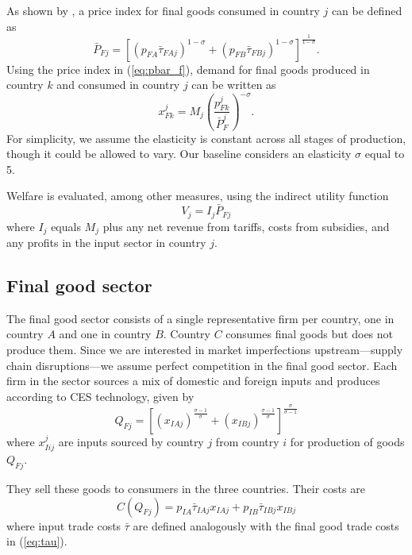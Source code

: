 \documentclass{article}
\begin{document}
As shown by \textcite{dixit_monopolistic_1977}, a price index for final goods consumed in country $j$ can be defined as
\begin{equation} \label{eq:pbar_f}
      \bar{P}_{Fj} = \left[ (p_{FA} \bar{\tau}_{FAj} )^{1-\sigma} +  (p_{FB} \bar{\tau}_{FBj})^{1-\sigma} \right]^\frac{1}{1-\sigma} .
\end{equation}
Using the price index in (\ref{eq:pbar_f}), demand for final goods produced in country $k$ and consumed in country $j$ can be written as
\begin{equation}
    x_{Fk}^{j} = M_j \left( \frac{p_{Fk}^{j}}{\bar{P}_F^{j}} \right)^{-\sigma}  .
\end{equation}
For simplicity, we assume the elasticity is constant across all stages of production, though it could be allowed to vary. Our baseline considers an elasticity $\sigma$ equal to 5.

Welfare is evaluated, among other measures, using the indirect utility function
\begin{equation} \label{eq:value}
    V_j = I_j \bar{P}_{Fj}
\end{equation}
where $I_j$ equals $M_j$ plus any net revenue from tariffs, costs from subsidies, and any profits in the input sector in country $j$.

\subsection{Final good sector}

The final good sector consists of a single representative firm per country, one in country $A$ and one in country $B$. Country $C$ consumes final goods but does not produce them. Since we are interested in market imperfections upstream---supply chain disruptions---we assume perfect competition in the final good sector. Each firm in the sector sources a mix of domestic and foreign inputs and produces according to CES technology, given by
\begin{equation}
    Q_{Fj} = \left[ \left( x_{IAj} \right)^\frac{\sigma-1}{\sigma} + \left( x_{IBj} \right)^\frac{\sigma-1}{\sigma} \right]^\frac{\sigma}{\sigma-1}
\end{equation}
where $x^j_{Iij}$ are inputs sourced by country $j$ from country $i$ for production of goods $Q_{Fj}$. 

They sell these goods to consumers in the three countries. Their costs are
\begin{equation}
    C(Q_{Fj}) = p_{IA} \bar{\tau}_{IAj} x_{IAj} + p_{IB} \bar{\tau}_{IBj} x_{IBj}
\end{equation}
where input trade costs $\bar{\tau}$ are defined analogously with the final good trade costs in (\ref{eq:tau}). 
\end{document}
